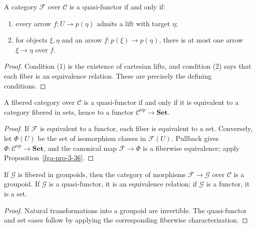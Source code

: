 \begin{proposition}\label{fga-pro-3-40}
A category $\mathcal F$ over $\mathcal C$ is a quasi-functor if and only if:
\begin{enumerate}
\item every arrow $f:U\to p(\eta)$ admits a lift with target $\eta$;
\item for objects $\xi,\eta$ and an arrow $f:p(\xi)\to p(\eta)$, there is at
most one arrow $\xi\to\eta$ over $f$.
\end{enumerate}
\end{proposition}
\begin{proof}
Condition (1) is the existence of cartesian lifts, and condition (2) says that
each fiber is an equivalence relation.  These are precisely the defining
conditions.
\end{proof}

\begin{proposition}\label{fga-pro-3-41}
A fibered category over $\mathcal C$ is a quasi-functor if and only if it is
equivalent to a category fibered in sets, hence to a functor
$\mathcal C^{\mathrm{op}}\to\mathbf{Set}$.
\end{proposition}
\begin{proof}
If $\mathcal F$ is equivalent to a functor, each fiber is equivalent to a set.
Conversely, let $\Phi(U)$ be the set of isomorphism classes in $\mathcal F(U)$.
Pullback gives $\Phi:\mathcal C^{\mathrm{op}}\to\mathbf{Set}$, and the
canonical map $\mathcal F\to\Phi$ is a fiberwise equivalence; apply
Proposition~\ref{fga-pro-3-36}.
\end{proof}

\begin{proposition}\label{fga-pro-3-42}
If $\mathcal G$ is fibered in groupoids, then the category of morphisms
$\mathcal F\to\mathcal G$ over $\mathcal C$ is a groupoid.  If $\mathcal G$ is a
quasi-functor, it is an equivalence relation; if $\mathcal G$ is a functor, it
is a set.
\end{proposition}
\begin{proof}
Natural transformations into a groupoid are invertible.  The quasi-functor and
set cases follow by applying the corresponding fiberwise characterization.
\end{proof}

